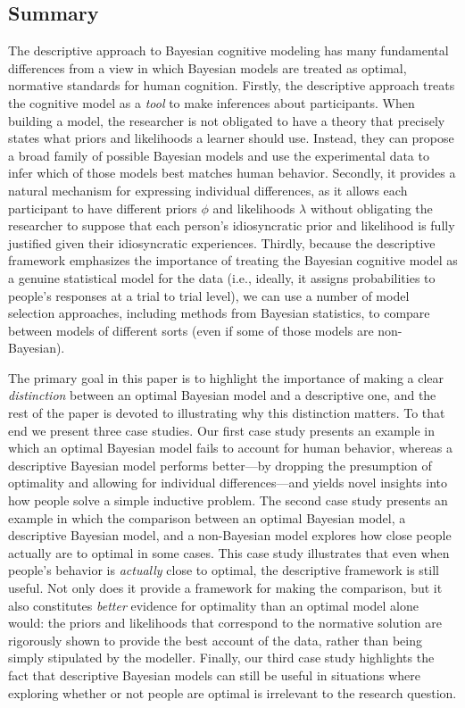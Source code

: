 \documentclass[doc,floatsintext]{apa6}
\begin{document}
\subsection*{Summary}

The descriptive approach to Bayesian cognitive modeling has many fundamental differences from a view in which Bayesian models are treated as optimal, normative standards for human cognition. Firstly, the descriptive approach treats the cognitive model as a {\it tool} to make inferences about participants. When building a model, the researcher is not obligated to have a theory that precisely states what priors and likelihoods a learner should use. Instead, they can propose a broad family of possible Bayesian models and use the experimental data to infer which of those models best matches human behavior. Secondly, it provides a natural mechanism for expressing individual differences, as it allows each participant to have different priors $\phi$ and likelihoods $\lambda$ without obligating the researcher to suppose that each person's idiosyncratic prior and likelihood is fully justified given their idiosyncratic experiences. Thirdly, because the descriptive framework emphasizes the importance of treating the Bayesian cognitive model as a genuine statistical model for the data (i.e., ideally, it assigns probabilities to people's responses at a trial to trial level), we can use a number of model selection approaches, including methods from Bayesian statistics, to compare between models of different sorts (even if some of those models are non-Bayesian).

The primary goal in this paper is to highlight the importance of making a clear {\it distinction} between an optimal Bayesian model and a descriptive one, and the rest of the paper is devoted to illustrating why this distinction matters. To that end we present three case studies. Our first case study presents an example in which an optimal Bayesian model fails to account for human behavior, whereas a descriptive Bayesian model performs better---by dropping the presumption of optimality and allowing for individual differences---and yields novel insights into how people solve a simple inductive problem. The second case study presents an example in which the comparison between an optimal Bayesian model, a descriptive Bayesian model, and a non-Bayesian model explores how close people actually are to optimal in some cases. This case study illustrates that even when people's behavior is {\it actually} close to optimal, the descriptive framework is still useful. Not only does it provide a framework for making the  comparison, but it also constitutes {\it better} evidence for optimality than an optimal model alone would: the priors and likelihoods that correspond to the normative solution are rigorously shown to provide the best account of the data, rather than being simply stipulated by the modeller. Finally, our third case study highlights the fact that descriptive Bayesian models can still be useful in situations where exploring whether or not people are optimal is irrelevant to the research question.
\end{document}

